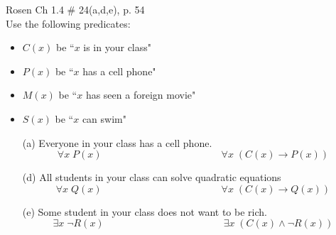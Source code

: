 \documentclass[12pt,addpoints]{exam}
\newcommand{\ra}{\rightarrow}
\begin{document}
\begin{questions}
\question Rosen Ch 1.4 \# 24(a,d,e), p. 54 \\
Use the following predicates:
\begin{itemize}[itemsep=0pt,parsep=0pt,topsep=0pt,partopsep=0pt]
    \item $C(x)$ be ``$x$ is in your class"
    \item $P(x)$ be ``$x$ has a cell phone"
    \item $M(x)$ be ``$x$ has seen a foreign movie"
    \item $S(x)$ be ``$x$ can swim"
\end{itemize}
    \ifprintanswers
        \vspace{-12pt}
    \fi
\begin{solution}
    \begin{itemize}[itemsep=0pt,parsep=0pt,topsep=0pt,partopsep=0pt]
        \item[(a)] Everyone in your class has a cell phone.
        $$ \forall x\; P(x) \hspace{2in} \forall x\; (C(x) \ra P(x))$$
        \item[(d)] All students in your class can solve quadratic equations
        $$ \forall x\; Q(x) \hspace{2in} \forall x\; (C(x) \ra Q(x))$$
        \item[(e)] Some student in your class does not want to be rich.
        $$ \exists x\; \neg R(x) \hspace{2in} \exists x\; (C(x) \wedge \neg R(x))$$
    \end{itemize}
\end{solution}



\end{questions}
\end{document}
